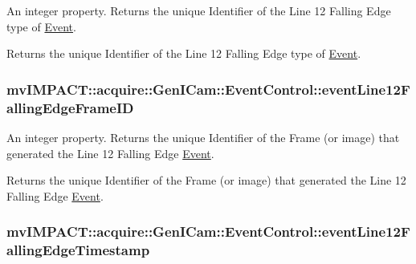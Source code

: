 An integer property. Returns the unique Identifier of the Line 12 Falling Edge type of \hyperlink{classmv_i_m_p_a_c_t_1_1acquire_1_1_event}{Event}. 

Returns the unique Identifier of the Line 12 Falling Edge type of \hyperlink{classmv_i_m_p_a_c_t_1_1acquire_1_1_event}{Event}. \hypertarget{classmv_i_m_p_a_c_t_1_1acquire_1_1_gen_i_cam_1_1_event_control_a9ef022abcc1fd9dc653b8a9f2f5795c7}{
\subsubsection[{event\+Line12\+Falling\+Edge\+Frame\+I\+D}]{ mv\+I\+M\+P\+A\+C\+T\+::acquire\+::\+Gen\+I\+Cam\+::\+Event\+Control\+::event\+Line12\+Falling\+Edge\+Frame\+I\+D}}\label{classmv_i_m_p_a_c_t_1_1acquire_1_1_gen_i_cam_1_1_event_control_a9ef022abcc1fd9dc653b8a9f2f5795c7}


An integer property. Returns the unique Identifier of the Frame (or image) that generated the Line 12 Falling Edge \hyperlink{classmv_i_m_p_a_c_t_1_1acquire_1_1_event}{Event}. 

Returns the unique Identifier of the Frame (or image) that generated the Line 12 Falling Edge \hyperlink{classmv_i_m_p_a_c_t_1_1acquire_1_1_event}{Event}. \hypertarget{classmv_i_m_p_a_c_t_1_1acquire_1_1_gen_i_cam_1_1_event_control_aa153eb7b1964b2d9a55e38f3ef7fc544}{
\subsubsection[{event\+Line12\+Falling\+Edge\+Timestamp}]{ mv\+I\+M\+P\+A\+C\+T\+::acquire\+::\+Gen\+I\+Cam\+::\+Event\+Control\+::event\+Line12\+Falling\+Edge\+Timestamp}}\label{classmv_i_m_p_a_c_t_1_1acquire_1_1_gen_i_cam_1_1_event_control_aa153eb7b1964b2d9a55e38f3ef7fc544}



